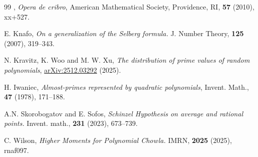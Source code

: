 \documentclass[reqno, 11pt]{amsart}
\numberwithin{equation}{section}
\theoremstyle{definition}
\renewcommand{\emph}[1]{\textit{#1}}
\newcommand{\0}{\mathbf{0}}
\renewcommand{\#}{\sharp}
\begin{document}
\begin{thebibliography}{99}
 \bysame,
\emph{Opera de cribro}, 
American Mathematical Society, Providence, RI,
{\bf 57} (2010), xx+527.

 
 E. Knafo,
\emph{On a generalization of the Selberg formula.} 
J. Number Theory,
{\bf 125} (2007), 319--343.
 

 N. Kravitz, K. Woo and M. W. Xu,
\emph{The distribution of prime values of random 
polynomials},
\href{https://arxiv.org/abs/2512.03292}{arXiv:2512.03292}
(2025).
  

 H. Iwaniec,
\emph{Almost-primes represented by quadratic polynomials},
Invent. Math., {\bf 47} (1978), 171--188.

 A.N. Skorobogatov and E. Sofos,
\emph{Schinzel Hypothesis on average and rational points.} 
Invent. math.,
{\bf 231} (2023), 673--739.
 
   
 
 C. Wilson,
\emph{Higher Moments for Polynomial Chowla.} 
IMRN,
{\bf 2025} (2025), rnaf097.
 
\end{thebibliography} 
\end{document}
